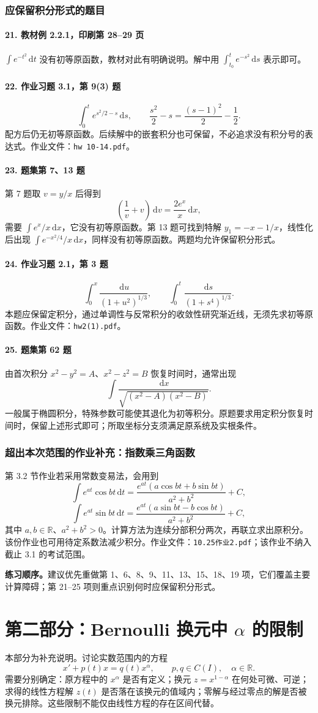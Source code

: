 \documentclass[11pt,a4paper]{ctexart}
\newcommand{\dd}{\,\mathrm d}
\newcommand{\R}{\mathbb R}
\newcommand{\entry}[1]{\subsection*{#1}}
\begin{document}
\section{应保留积分形式的题目}
\entry{21. 教材例 2.2.1，印刷第 28--29 页}
$\int e^{-t^2}\dd t$ 没有初等原函数，教材对此有明确说明。解中用 $\int_{t_0}^t e^{-s^2}\dd s$ 表示即可。

\entry{22. 作业习题 3.1，第 9(3) 题}
\[
\int_0^t e^{s^2/2-s}\dd s,\qquad
\frac{s^2}2-s=\frac{(s-1)^2}2-\frac12.
\]
配方后仍无初等原函数。后续解中的嵌套积分也可保留，不必追求没有积分号的表达式。作业文件：\texttt{hw 10-14.pdf}。

\entry{23. 题集第 7、13 题}
第 7 题取 $v=y/x$ 后得到
\[
\left(\frac1v+v\right)\dd v=\frac{2e^x}{x}\dd x,
\]
需要 $\int e^x/x\dd x$，它没有初等原函数。第 13 题可找到特解 $y_1=-x-1/x$，线性化后出现 $\int e^{-x^2/4}/x\dd x$，同样没有初等原函数。两题均允许保留积分形式。

\entry{24. 作业习题 2.1，第 3 题}
\[
\int_0^x\frac{\dd u}{(1+u^2)^{1/3}},\qquad
\int_0^t\frac{\dd s}{(1+s^4)^{1/3}}.
\]
本题应保留定积分，通过单调性与反常积分的收敛性研究渐近线，无须先求初等原函数。作业文件：\texttt{hw2(1).pdf}。

\entry{25. 题集第 62 题}
由首次积分 $x^2-y^2=A$、$x^2-z^2=B$ 恢复时间时，通常出现
\[
\int\frac{\dd x}{\sqrt{(x^2-A)(x^2-B)}}.
\]
一般属于椭圆积分，特殊参数可能使其退化为初等积分。原题要求用定积分恢复时间时，保留上述形式即可；所取坐标分支须满足原系统及实根条件。

\section{超出本次范围的作业补充：指数乘三角函数}
第 3.2 节作业若采用常数变易法，会用到
\[
\boxed{\int e^{at}\cos bt\dd t
=\frac{e^{at}(a\cos bt+b\sin bt)}{a^2+b^2}+C,}
\]
\[
\boxed{\int e^{at}\sin bt\dd t
=\frac{e^{at}(a\sin bt-b\cos bt)}{a^2+b^2}+C,}
\]
其中 $a,b\in\R$、$a^2+b^2>0$。计算方法为连续分部积分两次，再联立求出原积分。该份作业也可用待定系数法减少积分。作业文件：\texttt{10.25作业2.pdf}；该作业不纳入截止 3.1 的考试范围。

\textbf{练习顺序。}建议优先重做第 1、6、8、9、11、13、15、18、19 项，它们覆盖主要计算障碍；第 21--25 项则重点识别何时应保留积分形式。

\clearpage
\part*{第二部分：Bernoulli 换元中 $\alpha$ 的限制}
本部分为补充说明。讨论实数范围内的方程
\[
\boxed{x'+p(t)x=q(t)x^\alpha,\qquad p,q\in C(I),\quad\alpha\in\R.}
\]
需要分别确定：原方程中的 $x^\alpha$ 是否有定义；换元 $z=x^{1-\alpha}$ 在何处可微、可逆；求得的线性方程解 $z(t)$ 是否落在该换元的值域内；零解与经过零点的解是否被换元排除。这些限制不能仅由线性方程的存在区间代替。
\end{document}
